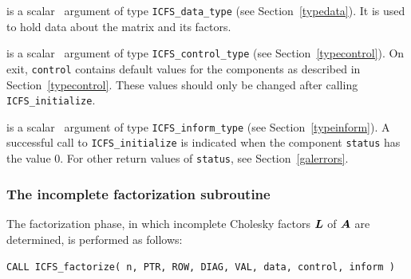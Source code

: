 \documentclass{galahad}
\newcommand{\packagename}{ICFS}
\begin{document}
\vspace*{-3mm}
\begin{description}

 is a scalar \intentinout\ argument of type
{\tt \packagename\_data\_type}
(see Section~\ref{typedata}). It is used to hold data about the
matrix and its factors.

 is a scalar \intentout\ argument of type
{\tt \packagename\_control\_type}
(see Section~\ref{typecontrol}).
On exit, {\tt control} contains default values for the components as
described in Section~\ref{typecontrol}.
These values should only be changed after calling
{\tt \packagename\_initialize}.

 is a scalar \intentout\ argument of type
{\tt \packagename\_inform\_type}
(see Section~\ref{typeinform}). A successful call to
{\tt \packagename\_initialize}
is indicated when the  component {\tt status} has the value 0.
For other return values of {\tt status}, see Section~\ref{galerrors}.

\end{description}


\subsubsection{The incomplete factorization subroutine}
The factorization phase, in which incomplete Cholesky factors ${\bm{L}}$ of
${\bm{A}}$ are determined, is performed as follows:

\vspace*{1mm}

\hspace{8mm}
{\tt CALL \packagename\_factorize( n, PTR, ROW, DIAG, VAL, data, control, inform )}
\end{document}
